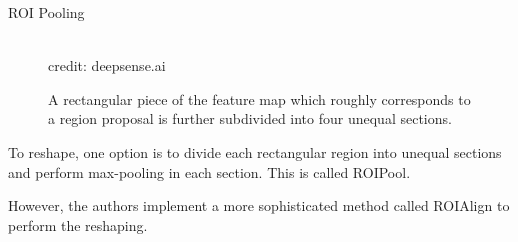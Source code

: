 \begin{frame} {ROI Pooling}
  \begin{figure}
    \centering
      \tiny{\\credit: deepsense.ai}
      \caption{A rectangular piece of the feature map which roughly corresponds to a region proposal is further subdivided into four unequal sections.}
  \end{figure}
  \begin{itemize}
    \item \small{To reshape, one option is to divide each rectangular region into unequal sections and perform max-pooling in each section. This is called ROIPool.
    \item However, the authors implement a more sophisticated method called ROIAlign to perform the reshaping.}
  \end{itemize}
\end{frame}

